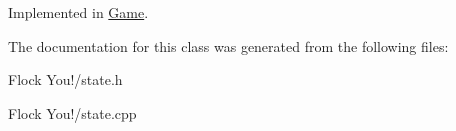 Implemented in \hyperlink{class_game_a419466336fad97182f5051e11f541636}{Game}.



The documentation for this class was generated from the following files\+:\begin{DoxyCompactItemize}
\item 
Flock You!/state.\+h\item 
Flock You!/state.\+cpp\end{DoxyCompactItemize}
